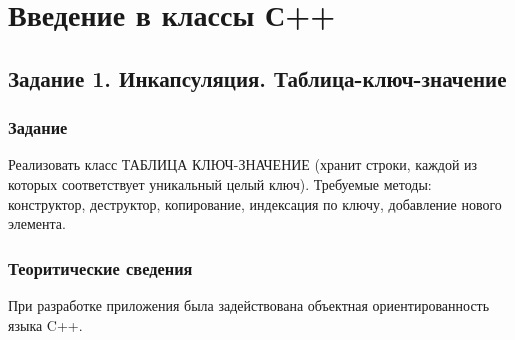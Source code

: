 \documentclass[12pt,a4paper]{report}
\begin{document}
\chapter{Введение в классы С++}
\section{Задание 1. Инкапсуляция. Таблица-ключ-значение}
\subsection{Задание}
\hspace{\parindent}
Реализовать класс ТАБЛИЦА КЛЮЧ-ЗНАЧЕНИЕ (хранит строки, каждой из которых соответствует уникальный целый ключ). Требуемые методы: конструктор, деструктор, копирование, индексация по ключу, добавление нового элемента.
\subsection{Теоритические сведения}
\hspace{\parindent}
При разработке приложения была задействована объектная ориентированность языка C++. 
\end{document}

